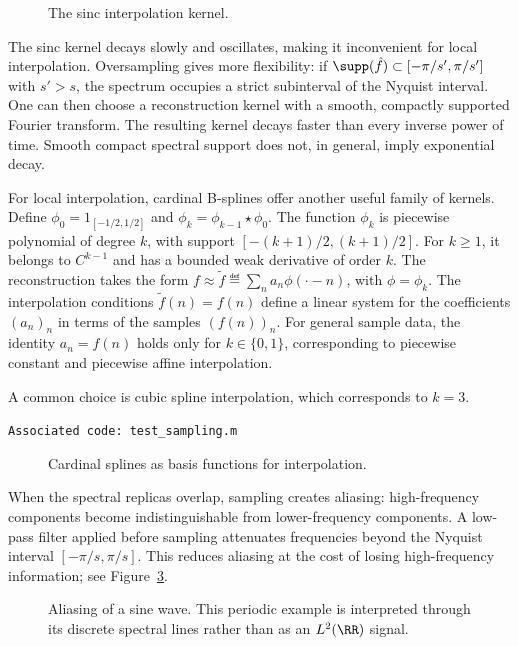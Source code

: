 \begin{figure}[tbp]
\centering
{}
\caption{The sinc interpolation kernel.}
\label{fig-review-shannon-sinc}
\end{figure}
The sinc kernel decays slowly and oscillates, making it inconvenient for local interpolation. Oversampling gives more flexibility: if $\supp(\hat f)\subset[-\pi/s',\pi/s']$ with $s'>s$, the spectrum occupies a strict subinterval of the Nyquist interval. One can then choose a reconstruction kernel with a smooth, compactly supported Fourier transform. The resulting kernel decays faster than every inverse power of time. Smooth compact spectral support does not, in general, imply exponential decay.

 
For local interpolation, cardinal B-splines offer another useful family of kernels. Define $\phi_0=1_{[-1/2,1/2]}$ and $\phi_k = \phi_{k-1} \star \phi_0$. The function $\phi_k$ is piecewise polynomial of degree $k$, with support $[-(k+1)/2,(k+1)/2]$. For $k\geq1$, it belongs to $C^{k-1}$ and has a bounded weak derivative of order $k$.
The reconstruction takes the form $f \approx \tilde f \eqdef \sum_n a_n \phi(\cdot-n)$, with $\phi=\phi_k$. The interpolation conditions $\tilde f(n)=f(n)$ define a linear system for the coefficients $(a_n)_n$ in terms of the samples $(f(n))_n$. For general sample data, the identity $a_n=f(n)$ holds only for $k \in \{0,1\}$, corresponding to piecewise constant and piecewise affine interpolation.
 
A common choice is cubic spline interpolation, which corresponds to $k=3$.

\texttt{Associated code: test\_sampling.m}

\begin{figure}[tbp]
\centering
{}
\caption{Cardinal splines as basis functions for interpolation.}
\label{fig-sampling-splines}
\end{figure}



When the spectral replicas overlap, sampling creates aliasing: high-frequency components become indistinguishable from lower-frequency components. A low-pass filter applied before sampling attenuates frequencies beyond the Nyquist interval $[-\pi/s,\pi/s]$. This reduces aliasing at the cost of losing high-frequency information; see Figure~\ref{fig-aliasing}.

\begin{figure}[tbp]
\centering
{}
\caption{Aliasing of a sine wave. This periodic example is interpreted through its discrete spectral lines rather than as an $L^2(\RR)$ signal.}
\label{fig-aliasing}
\end{figure}

